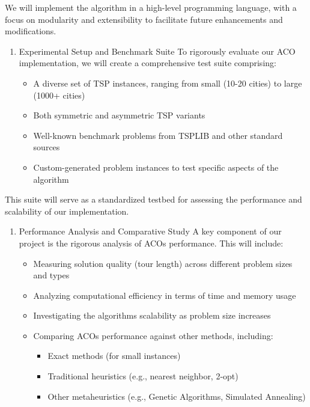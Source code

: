 \documentclass[
]{article}
\begin{document}
We will implement the algorithm in a high-level programming language,
with a focus on modularity and extensibility to facilitate future
enhancements and modifications.

\begin{enumerate}
\def\labelenumi{\arabic{enumi}.}
\setcounter{enumi}{2}
\item
  Experimental Setup and Benchmark Suite To rigorously evaluate our ACO
  implementation, we will create a comprehensive test suite comprising:

  \begin{itemize}
  \item
    A diverse set of TSP instances, ranging from small (10-20 cities) to
    large (1000+ cities)
  \item
    Both symmetric and asymmetric TSP variants
  \item
    Well-known benchmark problems from TSPLIB and other standard sources
  \item
    Custom-generated problem instances to test specific aspects of the
    algorithm
  \end{itemize}
\end{enumerate}

This suite will serve as a standardized testbed for assessing the
performance and scalability of our implementation.

\begin{enumerate}
\def\labelenumi{\arabic{enumi}.}
\setcounter{enumi}{3}
\item
  Performance Analysis and Comparative Study A key component of our
  project is the rigorous analysis of ACO\textquotesingle s performance.
  This will include:

  \begin{itemize}
  \item
    Measuring solution quality (tour length) across different problem
    sizes and types
  \item
    Analyzing computational efficiency in terms of time and memory usage
  \item
    Investigating the algorithm\textquotesingle s scalability as problem
    size increases
  \item
    Comparing ACO\textquotesingle s performance against other methods,
    including:

    \begin{itemize}
    \item
      Exact methods (for small instances)
    \item
      Traditional heuristics (e.g., nearest neighbor, 2-opt)
    \item
      Other metaheuristics (e.g., Genetic Algorithms, Simulated
      Annealing)
    \end{itemize}
  \end{itemize}
\end{enumerate}
\end{document}

